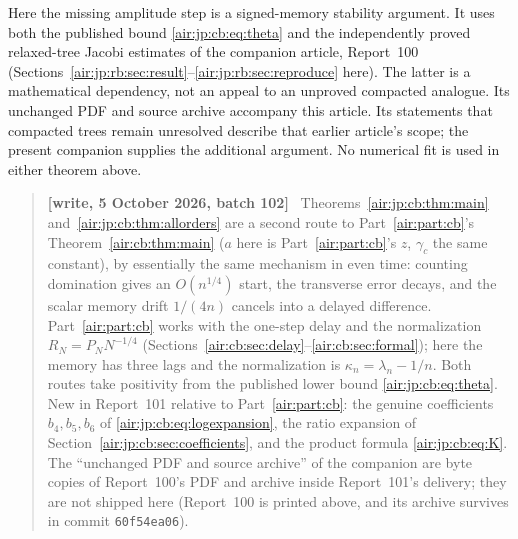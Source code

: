 \documentclass[11pt,letterpaper]{article}
\numberwithin{equation}{section}
\theoremstyle{remark}
\newenvironment{writenotejp}{\par\smallskip\begin{quote}\small\textbf{[write, 5 October 2026, batch 102]}\ }{\end{quote}\smallskip}
\begin{document}
Here the missing amplitude step is a signed-memory stability argument. It uses both the published bound \eqref{air:jp:cb:eq:theta} and the independently proved relaxed-tree Jacobi estimates of the companion article, Report~100 (Sections~\ref{air:jp:rb:sec:result}--\ref{air:jp:rb:sec:reproduce} here). The latter is a mathematical dependency, not an appeal to an unproved compacted analogue. Its unchanged PDF and source archive accompany this article. Its statements that compacted trees remain unresolved describe that earlier article's scope; the present companion supplies the additional argument. No numerical fit is used in either theorem above.
\begin{writenotejp}
Theorems~\ref{air:jp:cb:thm:main} and~\ref{air:jp:cb:thm:allorders} are a second route to Part~\ref{air:part:cb}'s Theorem~\ref{air:cb:thm:main} ($a$ here is Part~\ref{air:part:cb}'s $z$, $\gamma_c$ the same constant), by essentially the same mechanism in even time: counting domination gives an $O(n^{1/4})$ start, the transverse error decays, and the scalar memory drift $1/(4n)$ cancels into a delayed difference. Part~\ref{air:part:cb} works with the one-step delay and the normalization $R_N=P_NN^{-1/4}$ (Sections~\ref{air:cb:sec:delay}--\ref{air:cb:sec:formal}); here the memory has three lags and the normalization is $\kappa_n=\lambda_n-1/n$. Both routes take positivity from the published lower bound \eqref{air:jp:cb:eq:theta}. New in Report~101 relative to Part~\ref{air:part:cb}: the genuine coefficients $b_4,b_5,b_6$ of \eqref{air:jp:cb:eq:logexpansion}, the ratio expansion of Section~\ref{air:jp:cb:sec:coefficients}, and the product formula \eqref{air:jp:cb:eq:K}. The ``unchanged PDF and source archive'' of the companion are byte copies of Report~100's PDF and archive inside Report~101's delivery; they are not shipped here (Report~100 is printed above, and its archive survives in commit \texttt{60f54ea06}).
\end{writenotejp}
\end{document}
